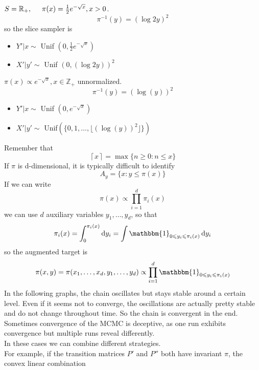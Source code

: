 \documentclass{article}
\begin{document}
\begin{example}

$S=\mathbb{R}_+, \hspace{0.5 cm} \pi(x)=\frac{1}{2}e^{-\sqrt{x}}, x > 0$.
\begin{equation*}
    \pi^{-1}(y) = (\log2y)^2
\end{equation*}
so the slice sampler is 
\begin{itemize}
    \item $Y'|x \sim$ Unif $(0,\frac{1}{2}e^{-\sqrt{x}} )$
    \item $X'|y' \sim$ Unif $(0,(\log2y))^2$
\end{itemize}

$\pi(x) \propto e^{-\sqrt{x}}, x \in \mathbb{Z}_+$ unnormalized.
\begin{equation*}
    \pi^{-1}(y) = (\log(y))^2
\end{equation*}
\begin{itemize}
    \item $Y'|x \sim$ Unif $(0,e^{-\sqrt{x}} )$
    \item $X'|y' \sim$ Unif$(\{0,1,\ldots, \lfloor{(\log(y))^2 \rfloor}\})$ 
\end{itemize}
Remember that 
\begin{equation*}
    \left \lceil{x}\right \rceil =\max \{n \geqslant 0: n \leqslant x\}
\end{equation*}
If $\pi$ is d-dimensional, it is typically difficult to identify
\begin{equation*}
    A_y = \{x: y \leqslant \pi(x)\}
\end{equation*}
If we can write 
\begin{equation*}
    \pi(x) \propto \prod_{i = 1}^d \pi_i(x)
\end{equation*}
we can use $d$ auxiliary variables $y_1, \ldots, y_d$, so that 
\begin{equation*}
    \pi_i(x) = \int_0^{\pi_i(x)}\dif y_i = \int \mathbbm{1}_{0 \leqslant y_i \leqslant \pi_i(x)} \dif y_i
\end{equation*}
so the augmented target is 
\begin{equation*}
    \pi(x,y)=\pi(x_1, \ldots, x_d, y_1, \ldots, y_d) \propto \prod_{i = 1}^d \mathbbm{1}_{0 \leqslant y_i \leqslant \pi_i(x)} 
\end{equation*}
In the following graphs, the chain oscillates but stays stable around a certain level. Even if it seems not to converge, the oscillations are actually pretty stable and do not change throughout time. So the chain is convergent in the end.\\

Sometimes convergence of the MCMC is deceptive, as one run exhibits convergence but multiple runs reveal differently. \\
In these cases we can combine different strategies. \\
For example, if the transition matrices $P'$ and $P''$ both have invariant $\pi$, the convex linear combination 
\end{example}
\end{document}
